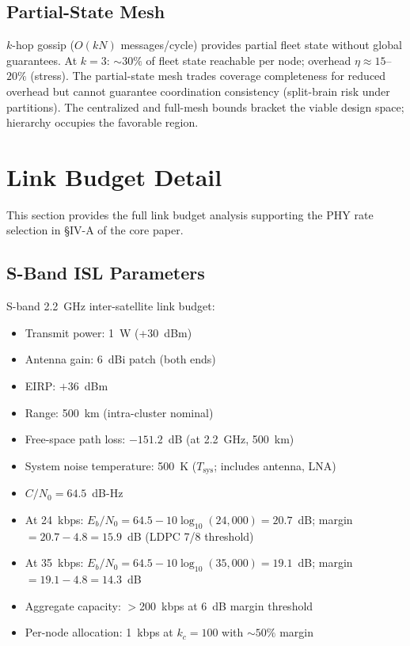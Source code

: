 \documentclass[journal]{IEEEtran}
\begin{document}
\subsection{Partial-State Mesh}

$k$-hop gossip ($O(kN)$ messages/cycle) provides partial fleet state without global guarantees. At $k = 3$: ${\sim}30\%$ of fleet state reachable per node; overhead $\eta \approx 15$--$20\%$ (stress). The partial-state mesh trades coverage completeness for reduced overhead but cannot guarantee coordination consistency (split-brain risk under partitions). The centralized and full-mesh bounds bracket the viable design space; hierarchy occupies the favorable region.


\section{Link Budget Detail}
\label{sec:supp-link-budget}

This section provides the full link budget analysis supporting the PHY rate selection in \S IV-A of the core paper.

\subsection{S-Band ISL Parameters}

S-band 2.2~GHz inter-satellite link budget:
\begin{itemize}
    \item Transmit power: 1~W (+30~dBm)
    \item Antenna gain: 6~dBi patch (both ends)
    \item EIRP: $+36$~dBm
    \item Range: 500~km (intra-cluster nominal)
    \item Free-space path loss: $-151.2$~dB (at 2.2~GHz, 500~km)
    \item System noise temperature: 500~K ($T_{\text{sys}}$; includes antenna, LNA)
    \item $C/N_0 = 64.5$~dB-Hz
    \item At 24~kbps: $E_b/N_0 = 64.5 - 10\log_{10}(24{,}000) = 20.7$~dB; margin $= 20.7 - 4.8 = 15.9$~dB (LDPC 7/8 threshold)
    \item At 35~kbps: $E_b/N_0 = 64.5 - 10\log_{10}(35{,}000) = 19.1$~dB; margin $= 19.1 - 4.8 = 14.3$~dB
    \item Aggregate capacity: $>$200~kbps at 6~dB margin threshold
    \item Per-node allocation: 1~kbps at $k_c = 100$ with ${\sim}50\%$ margin
\end{itemize}
\end{document}
